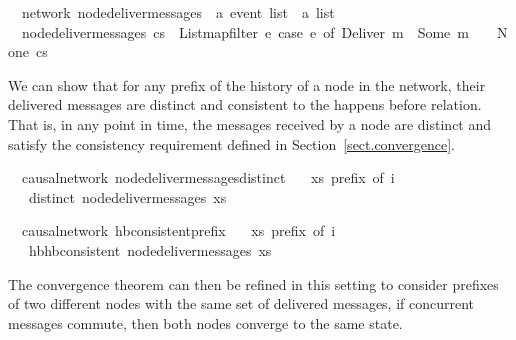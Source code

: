\documentclass[acmlarge,review,anonymous]{acmart}\settopmatter{printfolios=true}
\begin{document}
\begin{isabellebody}
\isanewline
{}\isamarkupfalse%
\ {\isacharparenleft}\ network{\isacharparenright}\ node{\isacharunderscore}deliver{\isacharunderscore}messages\ {\isacharcolon}{\isacharcolon}\ {\isachardoublequoteopen}{\isacharprime}a\ event\ list\ {\isasymRightarrow}\ {\isacharprime}a\ list{\isachardoublequoteclose}\ \isanewline
\ \ {\isachardoublequoteopen}node{\isacharunderscore}deliver{\isacharunderscore}messages\ cs\ {\isasymequiv}\ List{\isachardot}map{\isacharunderscore}filter\ {\isacharparenleft}{\isasymlambda}e{\isachardot}\ case\ e\ of\ Deliver\ m\ {\isasymRightarrow}\ Some\ m\ {\isacharbar}\ {\isacharunderscore}\ {\isasymRightarrow}\ None{\isacharparenright}\ cs{\isachardoublequoteclose}\isanewline
\end{isabellebody}

We can show that for any prefix of the history of a node in the network, their
delivered messages are distinct and consistent to the happens before relation.
That is, in any point in time, the messages received by a node are distinct
and satisfy the consistency requirement defined in Section~\ref{sect.convergence}.

\begin{isabellebody}
\isanewline
{}\isamarkupfalse%
\ {\isacharparenleft}\ causal{\isacharunderscore}network{\isacharparenright}\ node{\isacharunderscore}deliver{\isacharunderscore}messages{\isacharunderscore}distinct{\isacharcolon}\isanewline
\ \ \ {\isachardoublequoteopen}xs\ prefix\ of\ i{\isachardoublequoteclose}\isanewline
\ \ \ {\isachardoublequoteopen}distinct\ {\isacharparenleft}node{\isacharunderscore}deliver{\isacharunderscore}messages\ xs{\isacharparenright}{\isachardoublequoteclose}\isanewline

\isamarkupfalse%
\ {\isacharparenleft}\ causal{\isacharunderscore}network{\isacharparenright}\ hb{\isacharunderscore}consistent{\isacharunderscore}prefix{\isacharcolon}\isanewline
\ \ \ {\isachardoublequoteopen}xs\ prefix\ of\ i{\isachardoublequoteclose}\isanewline
\ \ \ {\isachardoublequoteopen}hb{\isachardot}hb{\isacharunderscore}consistent\ {\isacharparenleft}node{\isacharunderscore}deliver{\isacharunderscore}messages\ xs{\isacharparenright}{\isachardoublequoteclose}\isanewline
\end{isabellebody}

The convergence theorem can then be refined in this setting to consider
prefixes of two different nodes with the same set of delivered messages, if
concurrent messages commute, then both nodes converge to the same state.
\end{document}
